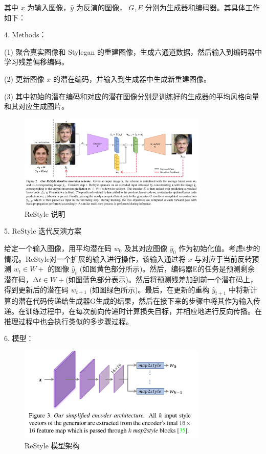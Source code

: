 其中 $x$ 为输入图像，$\hat{y}$ 为反演的图像， $G, E$ 分别为生成器和编码器。其具体工作如下：

4. Methods：

(1) 聚合真实图像和 Stylegan 的重建图像，生成六通道数据，然后输入到编码器中学习残差偏移编码。

(2) 更新图像 $x$ 的潜在编码，并输入到生成器中生成新重建图像。

(3) 其中初始的潜在编码和对应的潜在图像分别是训练好的生成器的平均风格向量和其对应生成图片。

 \begin{figure}[htb]
\centering 
\includegraphics[width=0.8\textwidth]{img/m3p3.png} 
\caption{ReStyle 说明}
\label{Test}
\end{figure}

5. ReStyle 迭代反演方案

给定一个输入图像，用平均潜在码 $w_0$ 及其对应图像 ${\hat{y}}_0$ 作为初始化值。考虑t步的情况。ReStyle对一个扩展的输入进行操作，该输入通过将 $x$ 与对应于当前反转预测 $w_t\in W+$ 的图像 ${\hat{y}}_t$ (如图黄色部分所示)。然后，编码器E的任务是预测剩余潜在码，$∆t∈W+$(如图蓝色部分表示)。然后将预测残差加到前一个潜在码上，得到更新后的潜在码 $w_{t+1}$ (如图绿色所示)。最后，在更新的重构 ${\hat{y}}_{t+1}$ 中将新计算的潜在代码传递给生成器G生成的结果，然后在接下来的步骤中将其作为输入传递。在训练过程中，在每次前向传递时计算损失目标，并相应地进行反向传播。在推理过程中也会执行类似的多步骤过程。

6. 模型：

\begin{figure}[htb]
\centering 
\includegraphics[width=0.8\textwidth]{img/m3p4.png} 
\caption{ReStyle 模型架构}
\label{Test}
\end{figure}

